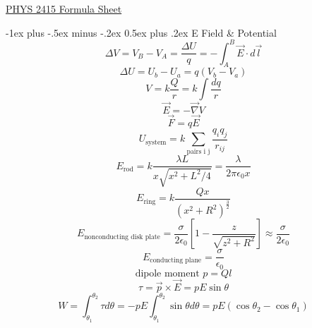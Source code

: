 \documentclass[12pt,landscape]{article}
\makeatletter
\renewcommand{\section}{\@startsection{section}{1}{0mm}%
                                {-1ex plus -.5ex minus -.2ex}%
                                {0.5ex plus .2ex}%
                                {\normalfont\large\bfseries}}
\makeatother
\begin{document}
\raggedright
\footnotesize
\begin{multicols}{3}

\setlength{\premulticols}{1pt}
\setlength{\postmulticols}{1pt}
\setlength{\multicolsep}{1pt}
\setlength{\columnsep}{2pt}
\setlength{\mathindent}{0pt}
\newcommand{\overbar}[1]{\mkern 1.5mu\overline{\mkern-1.5mu#1\mkern-1.5mu}\mkern 1.5mu}

\begin{center}
     \Large{\underline{PHYS 2415 Formula Sheet}} \\
\end{center}

\section{E Field \& Potential}
\begin{equation*}
    \Delta V = V_B - V_A = \frac{\Delta U}{q} = -\int_{A}^{B} \vec{E} \cdot d\vec{l}
\end{equation*}
\begin{equation*}
    \Delta U = U_b - U_a = q(V_b - V_a)
\end{equation*}
\begin{equation*}
    V = k\frac{Q}{r} = k \int \frac{dq}{r}
\end{equation*}
\begin{equation*}
    \vec{E} = - \vec{\nabla} V 
\end{equation*}
\begin{equation*}
    \vec{F} = q\vec{E}
\end{equation*}
\begin{equation*}
    U_{\text{system}} = k \sum_{\text{pairs i j}} \frac{q_i q_j}{r_{ij}}
\end{equation*}
\begin{equation*}
    E_{\text{rod}} = k \frac{\lambda L}{x \sqrt{x^2 + L^2 / 4}} = \frac{\lambda}{2\pi \epsilon_0 x }
\end{equation*}
\begin{equation*}
    E_{\text{ring}} = k \frac{Qx}{(x^2+R^2)^\frac{3}{2}}
\end{equation*}
\begin{equation*}
    E_{\text{nonconducting disk plate}} = \frac{\sigma}{2\epsilon_0} \left[1 - \frac{z}{\sqrt{z^2 + R^2}}\right] \approx \frac{\sigma}{2\epsilon_0}
\end{equation*}
\begin{equation*}
    E_{\text{conducting plane}} = \frac{\sigma}{\epsilon_0}
\end{equation*}
\begin{equation*}
    \text{dipole moment } p = Ql
\end{equation*}
\begin{equation*}
    \tau = \vec{p} \times \vec{E} = p E \sin{\theta}
\end{equation*}
\begin{equation*}
    W = \int_{\theta_1}^{\theta_2} \tau d\theta = -pE \int_{\theta_1}^{\theta_2} \sin{\theta} d\theta = p E (\cos{\theta_2} - \cos{\theta_1})
\end{equation*}


\end{multicols}
\end{document}
